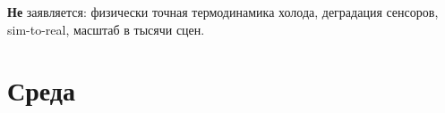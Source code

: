 \documentclass[11pt,a4paper]{article}
\begin{document}
\textbf{Не} заявляется: физически точная термодинамика холода, деградация
сенсоров, sim-to-real, масштаб в тысячи сцен.

\section{Среда}
\label{sec:env}






\end{document}
